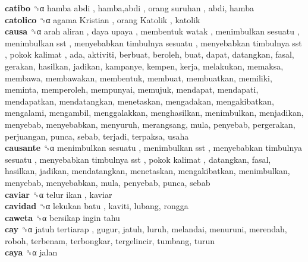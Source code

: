 \textbf{catibo} ␝α   hamba abdi ,  hamba,abdi ,  orang suruhan , abdi, hamba  \\
\textbf{catolico} ␝α   agama Kristian ,  orang Katolik , katolik  \\
\textbf{causa} ␝α   arah aliran ,  daya upaya ,  membentuk watak ,  menimbulkan sesuatu ,  menimbulkan sst ,  menyebabkan timbulnya sesuatu ,  menyebabkan timbulnya sst ,  pokok kalimat , ada, aktiviti, berbuat, beroleh, buat, dapat, datangkan, fasal, gerakan, hasilkan, jadikan, kampanye, kempen, kerja, melakukan, memaksa, membawa, membawakan, membentuk, membuat, membuatkan, memiliki, meminta, memperoleh, mempunyai, memujuk, mendapat, mendapati, mendapatkan, mendatangkan, menetaskan, mengadakan, mengakibatkan, mengalami, mengambil, menggalakkan, menghasilkan, menimbulkan, menjadikan, menyebab, menyebabkan, menyuruh, merangsang, mula, penyebab, pergerakan, perjuangan, punca, sebab, terjadi, terpaksa, usaha  \\
\textbf{causante} ␝α   menimbulkan sesuatu ,  menimbulkan sst ,  menyebabkan timbulnya sesuatu ,  menyebabkan timbulnya sst ,  pokok kalimat , datangkan, fasal, hasilkan, jadikan, mendatangkan, menetaskan, mengakibatkan, menimbulkan, menyebab, menyebabkan, mula, penyebab, punca, sebab  \\
\textbf{caviar} ␝α   telur ikan , kaviar  \\
\textbf{cavidad} ␝α   lekukan batu , kaviti, lubang, rongga  \\
\textbf{caweta} ␝α   bersikap ingin tahu   \\
\textbf{cay} ␝α   jatuh tertiarap , gugur, jatuh, luruh, melandai, menuruni, merendah, roboh, terbenam, terbongkar, tergelincir, tumbang, turun  \\
\textbf{caya} ␝α  jalan  \\
